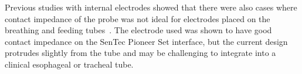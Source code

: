 Previous studies with internal electrodes showed that there were also
cases where contact impedance of the probe was not ideal for electrodes
placed on the breathing and feeding tubes~\parencite{czaplik_application_2014}.
The electrode used was shown to have good contact impedance on the SenTec Pioneer
Set interface, but the current design protrudes slightly from the tube and may be challenging to 
integrate into a clinical esophageal or tracheal tube. 


